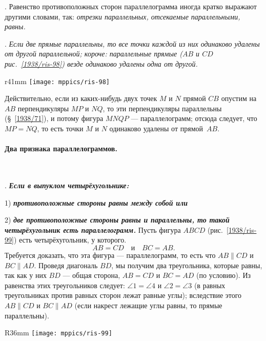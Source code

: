 \smallskip
{}.
Равенство противоположных сторон параллелограмма иногда кратко выражают другими словами, так:
\emph{отрезки параллельных, отсекаемые параллельными, равны.}

\smallskip
\mbox{.}
\emph{Если две прямые параллельны, то все точки каждой из них одинаково удалены от другой параллельной;
короче:
параллельные прямые \emph{($AB$ и $CD$ рис.~\ref{1938/ris-98})} везде одинаково удалены одна от другой.}

{

\begin{wrapfigure}{r}{41mm}
\centering
\vskip-6mm
\texttt{[image: mppics/ris-98]}
\caption{}\label{1938/ris-98}
\end{wrapfigure}

Действительно, если из каких-нибудь двух точек $M$ и $N$ прямой $CB$ опустим на $AB$ перпендикуляры $MP$ и $NQ$, то эти перпендикуляры параллельны (§~\ref{1938/71}), и потому фигура $MNQP$ — параллелограмм;
отсюда следует, что $MP=NQ$, то есть точки $M$ и $N$ одинаково удалены от прямой~$AB$.

}

\paragraph{Два признака параллелограммов.}\label{1938/89}\ 

\smallskip
\mbox{.}
\textbf{\emph{Если в выпуклом четырёхугольнике:}}

1) \textbf{\emph{противоположные стороны равны между собой или}}

2) \textbf{\emph{две противоположные стороны равны и параллельны, то такой четырёхугольник есть параллелограмм.}}
Пусть фигура $ABCD$ (рис.~\ref{1938/ris-99}) есть четырёхугольник, у которого.
\[AB=CD\quad \text{и}\quad BC=AB.\]
Требуется доказать, что эта фигура — параллелограмм, то есть что $AB\parallel CD$ и $BC \parallel AD$.
Проведя диагональ $BD$, мы получим два треугольника, которые равны, так как у них $BD$ — общая сторона, $AB=CD$ и $BC = AD$ (по условию).
Из равенства этих треугольников следует:
$\angle 1 = \angle 4 $ и $\angle 2 = \angle 3$ (в равных треугольниках против равных сторон лежат равные углы);
вследствие этого $AB \parallel CD$ и $BC\parallel AD$ (если накрест лежащие углы равны, то прямые параллельны).

\begin{wrapfigure}{R}{36mm}
\centering
\texttt{[image: mppics/ris-99]}
\caption{}\label{1938/ris-99}
\end{wrapfigure}

